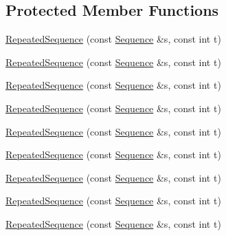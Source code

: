 \subsection*{Protected Member Functions}
\begin{DoxyCompactItemize}
\item 
\mbox{\hyperlink{classfakeit_1_1RepeatedSequence_ac83fde9f96aa63322c82ffd44ff33a75}{Repeated\+Sequence}} (const \mbox{\hyperlink{classfakeit_1_1Sequence}{Sequence}} \&s, const int t)
\item 
\mbox{\hyperlink{classfakeit_1_1RepeatedSequence_ac83fde9f96aa63322c82ffd44ff33a75}{Repeated\+Sequence}} (const \mbox{\hyperlink{classfakeit_1_1Sequence}{Sequence}} \&s, const int t)
\item 
\mbox{\hyperlink{classfakeit_1_1RepeatedSequence_ac83fde9f96aa63322c82ffd44ff33a75}{Repeated\+Sequence}} (const \mbox{\hyperlink{classfakeit_1_1Sequence}{Sequence}} \&s, const int t)
\item 
\mbox{\hyperlink{classfakeit_1_1RepeatedSequence_ac83fde9f96aa63322c82ffd44ff33a75}{Repeated\+Sequence}} (const \mbox{\hyperlink{classfakeit_1_1Sequence}{Sequence}} \&s, const int t)
\item 
\mbox{\hyperlink{classfakeit_1_1RepeatedSequence_ac83fde9f96aa63322c82ffd44ff33a75}{Repeated\+Sequence}} (const \mbox{\hyperlink{classfakeit_1_1Sequence}{Sequence}} \&s, const int t)
\item 
\mbox{\hyperlink{classfakeit_1_1RepeatedSequence_ac83fde9f96aa63322c82ffd44ff33a75}{Repeated\+Sequence}} (const \mbox{\hyperlink{classfakeit_1_1Sequence}{Sequence}} \&s, const int t)
\item 
\mbox{\hyperlink{classfakeit_1_1RepeatedSequence_ac83fde9f96aa63322c82ffd44ff33a75}{Repeated\+Sequence}} (const \mbox{\hyperlink{classfakeit_1_1Sequence}{Sequence}} \&s, const int t)
\item 
\mbox{\hyperlink{classfakeit_1_1RepeatedSequence_ac83fde9f96aa63322c82ffd44ff33a75}{Repeated\+Sequence}} (const \mbox{\hyperlink{classfakeit_1_1Sequence}{Sequence}} \&s, const int t)
\item 
\mbox{\hyperlink{classfakeit_1_1RepeatedSequence_ac83fde9f96aa63322c82ffd44ff33a75}{Repeated\+Sequence}} (const \mbox{\hyperlink{classfakeit_1_1Sequence}{Sequence}} \&s, const int t)
\end{DoxyCompactItemize}
